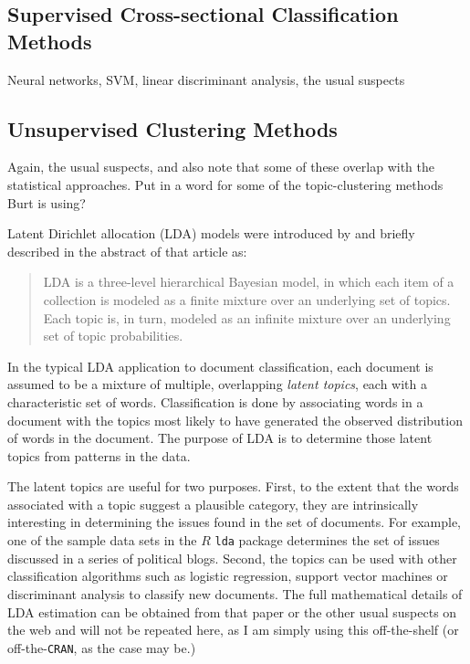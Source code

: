 \documentclass[graybox]{svmult}
\begin{document}
\subsection{Supervised Cross-sectional Classification Methods}
\label{sec:logit}

Neural networks, SVM, linear discriminant analysis, the usual suspects


\subsection{Unsupervised Clustering Methods}
\label{sec:logit}

Again, the usual suspects, and also note that some of these overlap with the statistical approaches. Put in a word for some of the topic-clustering methods Burt is using?

Latent Dirichlet allocation (LDA) models were introduced by \cite{BNJ03} and briefly described in the abstract of that article as:

\begin{quote}
LDA is a three-level hierarchical Bayesian model, in which each item of a collection is modeled as a finite mixture over an underlying set of topics. Each topic is, in turn, modeled as an infinite mixture over an underlying set of topic probabilities.
\end{quote}

In the typical LDA application to document classification, each document is assumed to be a mixture of multiple, overlapping \textit{latent topics}, each with a characteristic set of words. Classification is done by associating words in a document with the topics most likely to have generated the observed distribution of words in the document. The purpose of LDA is to determine those latent topics from patterns in the data. 

The latent topics are useful for two purposes. First, to the extent that the words associated with a topic suggest a plausible category, they are intrinsically interesting in determining the issues found in the set of documents. For example, one of the sample data sets in the $R$ \texttt{lda} package \cite{Chang10} determines the set of issues discussed in a series of political blogs. Second, the topics can be used with other classification algorithms such as logistic regression, support vector machines or discriminant analysis to classify new documents. The full mathematical details of LDA estimation can be obtained from that paper or the other usual suspects on the web and will not be repeated here, as I am simply using this off-the-shelf (or off-the-\texttt{CRAN}, as the case may be.)
\end{document}
